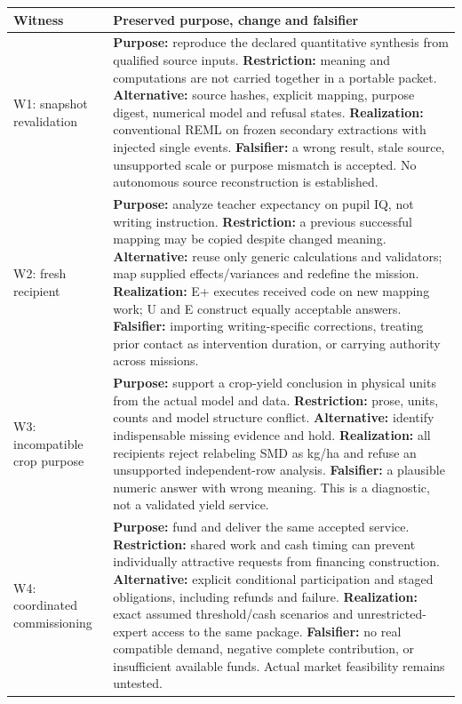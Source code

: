 \begin{longtable}{p{}p{}}
\toprule
Witness & Preserved purpose, change and falsifier\\
\midrule
\endhead
W1: snapshot revalidation & \textbf{Purpose:} reproduce the declared quantitative synthesis from qualified source inputs. \textbf{Restriction:} meaning and computations are not carried together in a portable packet. \textbf{Alternative:} source hashes, explicit mapping, purpose digest, numerical model and refusal states. \textbf{Realization:} conventional REML on frozen secondary extractions with injected single events. \textbf{Falsifier:} a wrong result, stale source, unsupported scale or purpose mismatch is accepted. No autonomous source reconstruction is established.\\
W2: fresh recipient & \textbf{Purpose:} analyze teacher expectancy on pupil IQ, not writing instruction. \textbf{Restriction:} a previous successful mapping may be copied despite changed meaning. \textbf{Alternative:} reuse only generic calculations and validators; map supplied effects/variances and redefine the mission. \textbf{Realization:} E+ executes received code on new mapping work; U and E construct equally acceptable answers. \textbf{Falsifier:} importing writing-specific corrections, treating prior contact as intervention duration, or carrying authority across missions.\\
W3: incompatible crop purpose & \textbf{Purpose:} support a crop-yield conclusion in physical units from the actual model and data. \textbf{Restriction:} prose, units, counts and model structure conflict. \textbf{Alternative:} identify indispensable missing evidence and hold. \textbf{Realization:} all recipients reject relabeling SMD as kg/ha and refuse an unsupported independent-row analysis. \textbf{Falsifier:} a plausible numeric answer with wrong meaning. This is a diagnostic, not a validated yield service.\\
W4: coordinated commissioning & \textbf{Purpose:} fund and deliver the same accepted service. \textbf{Restriction:} shared work and cash timing can prevent individually attractive requests from financing construction. \textbf{Alternative:} explicit conditional participation and staged obligations, including refunds and failure. \textbf{Realization:} exact assumed threshold/cash scenarios and unrestricted-expert access to the same package. \textbf{Falsifier:} no real compatible demand, negative complete contribution, or insufficient available funds. Actual market feasibility remains untested.\\
\bottomrule
\end{longtable}


